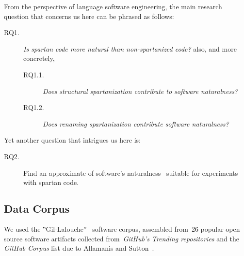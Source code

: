 From the perspective of language software engineering, the main research
question that concerns us here can be phrased as follows:
\begin{description}
  \item[RQ1.] \emph{Is spartan code more natural than non-spartanized code?} also,
        and more concretely,
        \begin{description}
          \item[RQ1.1.] \emph{Does structural spartanization contribute to software naturalness?}
          \item[RQ1.2.] \emph{Does renaming spartanization contribute software naturalness?}
        \end{description}
\end{description}
Yet another question that intrigues us here is:
\begin{description}
  \item[RQ2.] Find an approximate of software's
        naturalness~\cite{Hindle:Bar:Su:Gabel:Devanbu:12} suitable
        for experiments with spartan code.
\end{description}

\subsection{Data Corpus}
We used the ‟Gil-Lalouche”~\cite{Gil:Lalouche:16} software corpus,
assembled from~26 popular \Java open source software artifacts collected
from~\emph{GitHub's Trending
  repositories} and
the \emph{GitHub \Java Corpus}%
list due to Allamanis and Sutton~\cite{Allamanis:Sutton:13}.

